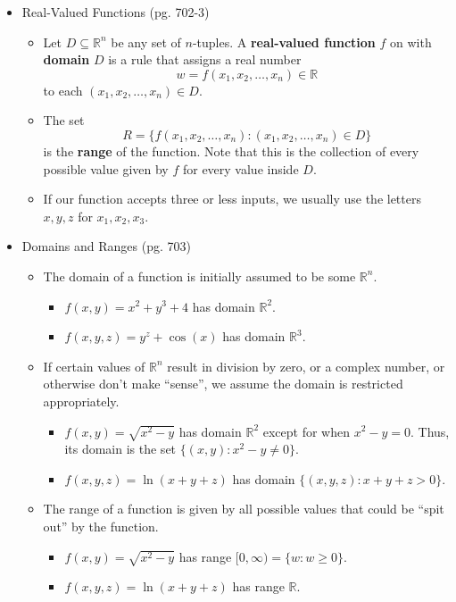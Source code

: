 \documentclass[12pt]{article}
\theoremstyle{plain}
\theoremstyle{definition}
\theoremstyle{remark}
\begin{document}
	\begin{itemize}
	
	\item Real-Valued Functions (pg. 702-3)
	
		\begin{itemize}
		\item Let $D\subseteq \mathbb{R}^n$ be any set of $n$-tuples. A \textbf{real-valued function} $f$ on with \textbf{domain} $D$ is a rule that assigns a real number \[w = f(x_1,x_2,\dots,x_n) \in \mathbb{R}\] to each $(x_1,x_2,\dots,x_n) \in D$.
		\item The set \[R = \{f(x_1,x_2,\dots,x_n) : (x_1,x_2,\dots,x_n) \in D\}\] is the \textbf{range} of the function. Note that this is the collection of every possible value given by $f$ for every value inside $D$.
		\item If our function accepts three or less inputs, we usually use the letters $x,y,z$ for $x_1,x_2,x_3$.
		\end{itemize}
		
	\item Domains and Ranges (pg. 703)
	
		\begin{itemize}
		\item The domain of a function is initially assumed to be some $\mathbb{R}^n$.
			\begin{itemize}
			\item $f(x,y) = x^2+y^3+4$ has domain $\mathbb{R}^2$.
			\item $f(x,y,z) = y^z + \cos(x)$ has domain $\mathbb{R}^3$.
			\end{itemize}
		\item If certain values of $\mathbb{R}^n$ result in division by zero, or a complex number, or otherwise don't make ``sense'', we assume the domain is restricted appropriately.
			\begin{itemize}
			\item $f(x,y) = \sqrt{x^2-y}$ has domain $\mathbb{R}^2$ except for when $x^2-y=0$. Thus, its domain is the set $\{(x,y):x^2-y\not=0\}$.
			\item $f(x,y,z) = \ln(x+y+z)$ has domain $\{(x,y,z) : x+y+z>0\}$.
			\end{itemize}
		\item The range of a function is given by all possible values that could be ``spit out'' by the function.
			\begin{itemize}
			\item $f(x,y) = \sqrt{x^2-y}$ has range $[0,\infty)=\{w: w\geq 0\}$.
			\item $f(x,y,z) = \ln(x+y+z)$ has range $\mathbb{R}$.
			\end{itemize}
		\end{itemize}
		

\end{itemize}
\end{document}
